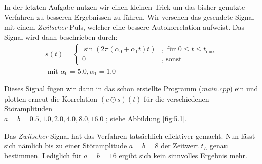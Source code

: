 \documentclass[ngerman]{scrartcl}
\begin{document}
\subsection{}

In der letzten Aufgabe nutzen wir einen kleinen Trick um das bisher genutzte Verfahren zu besseren Ergebnissen zu führen. Wir versehen das gesendete Signal mit einem \emph{Zwitscher}-Puls, welcher eine bessere Autokorrelation aufweist. Das Signal wird dann beschrieben durch:
\begin{align*}
s(t)=\left\{\begin{array}{ll}
\sin (2 \pi (\alpha_0+\alpha_1 t) t)&,\text { für } 0 \leq t \leq t_{\max } \\
0& ,\text { sonst }
\end{array}\right.\\
\text{ mit } \alpha_0=5.0, \alpha_1=1.0
\end{align*}

Dieses Signal fügen wir dann in das schon erstellte Programm (\emph{main.cpp}) ein und plotten erneut die Korrelation $(e \odot s)(t)$ für die verschiedenen Störamplituden\\ $a=b=0.5, 1.0, 2.0, 4.0, 8.0, 16.0$ ; siehe Abbildung \ref{fig:5.1}.





Das \emph{Zwitscher}-Signal hat das Verfahren tatsächlich effektiver gemacht. Nun lässt sich nämlich bis zu einer Störamplitude $a=b=8$ der Zeitwert $t_L$ genau bestimmen. Lediglich für $a=b=16$ ergibt sich kein sinnvolles Ergebnis mehr.
\end{document}
